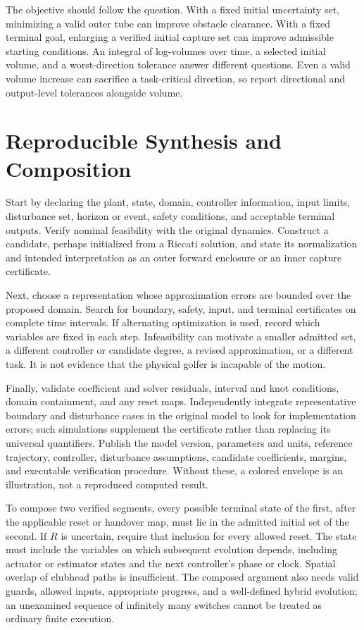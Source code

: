 \documentclass[12pt, openany]{book}
\theoremstyle{plain}
\begin{document}
The objective should follow the question. With a fixed initial uncertainty set, minimizing a valid outer tube can improve obstacle clearance. With a fixed terminal goal, enlarging a verified initial capture set can improve admissible starting conditions. An integral of log-volumes over time, a selected initial volume, and a worst-direction tolerance answer different questions. Even a valid volume increase can sacrifice a task-critical direction, so report directional and output-level tolerances alongside volume.

\section{Reproducible Synthesis and Composition}

Start by declaring the plant, state, domain, controller information, input limits, disturbance set, horizon or event, safety conditions, and acceptable terminal outputs. Verify nominal feasibility with the original dynamics. Construct a candidate, perhaps initialized from a Riccati solution, and state its normalization and intended interpretation as an outer forward enclosure or an inner capture certificate.

Next, choose a representation whose approximation errors are bounded over the proposed domain. Search for boundary, safety, input, and terminal certificates on complete time intervals. If alternating optimization is used, record which variables are fixed in each step. Infeasibility can motivate a smaller admitted set, a different controller or candidate degree, a revised approximation, or a different task. It is not evidence that the physical golfer is incapable of the motion.

Finally, validate coefficient and solver residuals, interval and knot conditions, domain containment, and any reset maps. Independently integrate representative boundary and disturbance cases in the original model to look for implementation errors; such simulations supplement the certificate rather than replacing its universal quantifiers. Publish the model version, parameters and units, reference trajectory, controller, disturbance assumptions, candidate coefficients, margins, and executable verification procedure. Without these, a colored envelope is an illustration, not a reproduced computed result.

To compose two verified segments, every possible terminal state of the first, after the applicable reset or handover map, must lie in the admitted initial set of the second. If $R$ is uncertain, require that inclusion for every allowed reset. The state must include the variables on which subsequent evolution depends, including actuator or estimator states and the next controller's phase or clock. Spatial overlap of clubhead paths is insufficient. The composed argument also needs valid guards, allowed inputs, appropriate progress, and a well-defined hybrid evolution; an unexamined sequence of infinitely many switches cannot be treated as ordinary finite execution.
\end{document}

